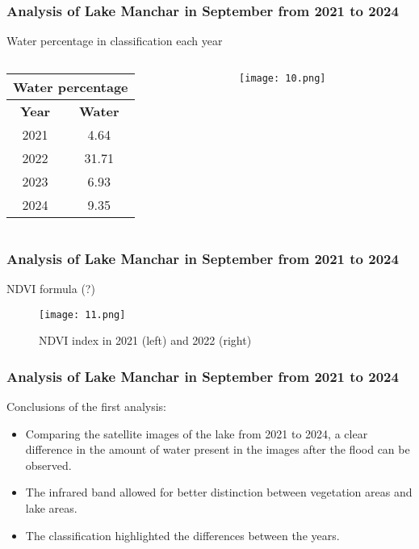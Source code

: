 \documentclass{beamer}
\begin{document}
\begin{frame}
  \frametitle{\small Analysis of Lake Manchar in September from 2021 to 2024} 

  \centering
  \small Water percentage in classification each year

  \begin{columns}  %
    \begin{column}{0.45\textwidth}  %
      \centering
      \begin{tabular}{|c|c|}
      \hline
      \multicolumn{2}{|c|}{Water percentage} \\ 
      \hline
      \textbf{Year} & \textbf{Water} \\  
      \hline
      2021 & 4.64 \\
      \hline
      2022 & 31.71 \\
      \hline
      2023 & 6.93 \\
      \hline
      2024 & 9.35 \\
      \hline
      \end{tabular}
    \end{column}

    \begin{column}{0.45\textwidth}  %
      \centering
      \texttt{[image: 10.png]}
      \label{fig:enter-label}
    \end{column}
  \end{columns}  %

\end{frame}


\begin{frame}
  \frametitle{\small Analysis of Lake Manchar in September from 2021 to 2024} 

    \centering
    \small NDVI formula (?)
    
        \begin{figure}
        \centering
        \texttt{[image: 11.png]}
        \caption{NDVI index in 2021 (left) and 2022 (right)}
        \label{fig:enter-label}
    \end{figure}
  
\end{frame}

\begin{frame}
  \frametitle{\small Analysis of Lake Manchar in September from 2021 to 2024} 

    \small Conclusions of the first analysis:
    \begin{itemize}
        \item \small Comparing the satellite images of the lake from 2021 to 2024, a clear difference in the amount of water present in the images after the flood can be observed.
        \item \small The infrared band allowed for better distinction between vegetation areas and lake areas.
        \item \small The classification highlighted the differences between the years.
    \end{itemize} 
  
\end{frame}
\end{document}
